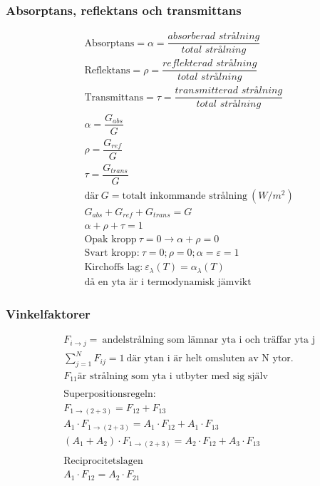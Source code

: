 \subsubsection*{Absorptans, reflektans och transmittans}
\begin{align*}
	& \text{Absorptans} = \alpha = \dfrac{\textit{absorberad strålning}}{\textit{total strålning}} \\
	& \text{Reflektans} = \rho = \dfrac{\textit{reflekterad strålning}}{\textit{total strålning}} \\
	& \text{Transmittans} = \tau = \dfrac{\textit{transmitterad strålning}}{\textit{total strålning}} \\
	& \alpha = \dfrac{G_{abs}}{G} \\
	& \rho = \dfrac{G_{ref}}{G} \\
	& \tau = \dfrac{G_{trans}}{G} \\
	&	\text{där} \ G = \text{totalt inkommande strålning} \ (W/m^2) \\
	& G_{abs} + G_{ref} + G_{trans} = G \\
	& \alpha + \rho + \tau = 1 \\
	& \text{Opak kropp} \ \tau = 0 \rightarrow \alpha + \rho = 0 \\
	& \text{Svart kropp:} \ \tau=0; \rho = 0; \alpha = \varepsilon = 1 \\
	& \text{Kirchoffs lag:} \ \varepsilon_\lambda(T) = \alpha_\lambda(T) \\ &\text{då en yta är i termodynamisk jämvikt}
\end{align*}
\subsubsection*{Vinkelfaktorer}
\begin{align*}
	& F_{i \rightarrow j} = \ \text{andelstrålning som lämnar yta i och träffar yta j} \\
	& \sum\limits_{j=1}^N F_{ij} = 1 \ \text{där ytan i är helt omsluten av N ytor.} \\ 
	& F_{11} \text{är strålning som yta i utbyter med sig själv}\\
	\\
	& \text{Superpositionsregeln:} \\
	& F_{1 \rightarrow (2+3)} = F_{12} + F_{13} \\
	& A_1  \cdot F_{1 \rightarrow (2+3)} = A_1 \cdot F_{12} + A_1 \cdot F_{13} \\
	& (A_1 + A_2) \cdot F_{1 \rightarrow (2+3)} = A_2 \cdot F_{12} + A_3 \cdot F_{13} \\
	\\
	& \text{Reciprocitetslagen} \\
	& A_1 \cdot F_{12} = A_2 \cdot F_{21}
\end{align*}
